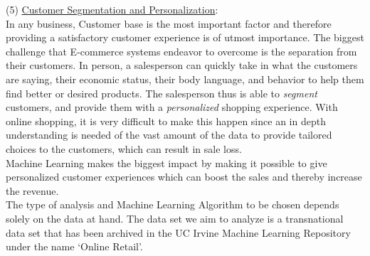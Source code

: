 (5) \underline{Customer Segmentation and Personalization}: \\
In any business, Customer base is the most important factor and therefore providing a satisfactory customer experience is of utmost importance. The biggest challenge that E-commerce systems endeavor to overcome is the separation from their customers. In person, a salesperson can quickly take in what the customers are saying, their economic status, their body language, and behavior to help them find better or desired products. The salesperson thus is able to \emph{segment} customers, and provide them with a \emph{personalized} shopping experience. With online shopping, it is very difficult to make this happen since an in depth understanding is needed of the vast amount of the data to provide tailored choices to the customers, which can result in sale loss. \\
Machine Learning makes the biggest impact by making it possible to give personalized customer experiences which can boost the sales and thereby increase the revenue.\\ 
The type of analysis and Machine Learning Algorithm to be chosen depends solely on the data at hand. The data set we aim to analyze is a transnational data set that has been archived in the UC Irvine Machine Learning Repository under the name `Online Retail'. \\

